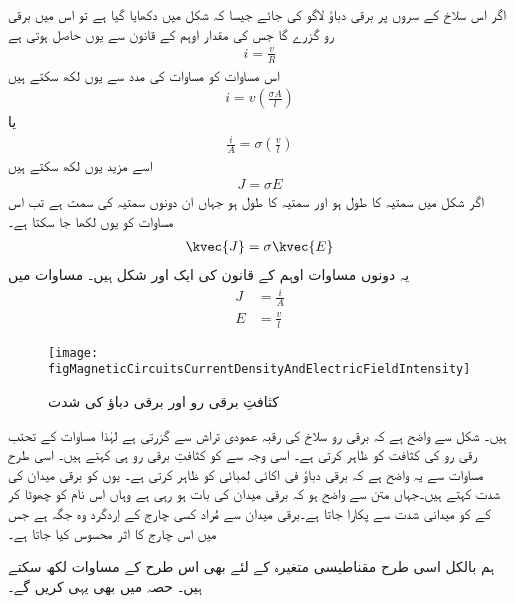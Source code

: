 اگر اس سلاخ کے سروں پر برقی دباؤ  لاگو کی جائے جیسا کہ شکل   میں دکھایا گیا ہے تو اس میں برقی رو  گزرے گا جس کی مقدار اوہم کے قانون  سے یوں حاصل ہوتی ہے
\begin{align}
i=\frac{v}{R}
\end{align}
اس مساوات کو مساوات  کی مدد سے یوں لکھ سکتے ہیں
\begin{align}
i=v \left(\frac{\sigma A}{l}\right)
\end{align}
یا
\begin{align}
\frac{i}{A}=\sigma \left(\frac{v}{l} \right)
\end{align}
اسے مزید یوں لکھ سکتے ہیں
\begin{align}
J =\sigma E
\end{align}
اگر شکل میں سمتیہ  کا طول  ہو اور سمتیہ  کا طول  ہو جہاں ان دونوں سمتیہ کی سمت   ہے تب  اس مساوات کو یوں لکھا جا سکتا ہے۔
\begin{align}
\kvec{J}=\sigma \kvec{E}
\end{align}
یہ دونوں مساوات اوہم کے قانون کی ایک اور شکل ہیں۔ مساوات  میں 
\begin{align}
J&=\frac{i}{A}\\
E&=\frac{v}{l}
\end{align}
%
\begin{figure}
\centering
\texttt{[image: figMagneticCircuitsCurrentDensityAndElectricFieldIntensity]}
\caption{کثافتِ برقی رو اور برقی دباؤ کی شدت}
\label{شکل_مقناطیسی_دور_کثافت_رو_اور_برقی_شدت}
\end{figure}
ہیں۔ شکل سے واضح ہے کہ برقی رو  سلاخ کی رقبہ عمودی تراش  سے گزرتی ہے لہٰذا مساوات کے تحتب  رقی رو کی کثافت کو ظاہر کرتی ہے۔ اسی وجہ سے  کو کثافتِ برقی رو  ہی کہتے ہیں۔ اسی طرح مساوات   سے یہ واضح ہے کہ  برقی دباؤ فی اکائی لمبائی کو ظاہر کرتی ہے۔  یوں   کو برقی میدان کی شدت کہتے ہیں۔جہاں متن سے واضح ہو کہ برقی میدان کی بات ہو رہی ہے وہاں اس نام کو چھوٹا کر کے  کو میدانی شدت  سے پکارا جاتا ہے۔برقی میدان سے مُراد کسی چارج کے اِردگرد وہ جگہ ہے جس میں اس چارج کا اثر محسوس کیا جاتا ہے۔

	ہم بالکل اسی طرح مقناطیسی متغیرہ کے لئے بھی اس طرح کے مساوات لکھ سکتے ہیں۔ حصہ  میں بھی یہی کریں گے۔

